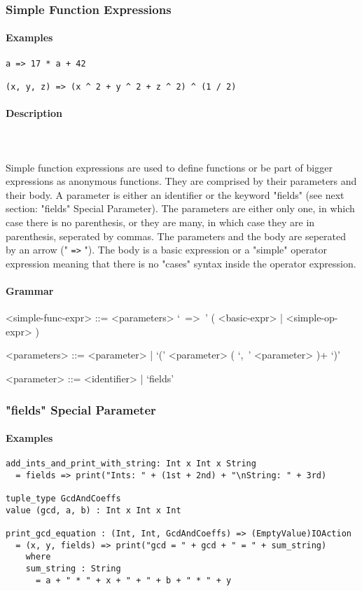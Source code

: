 \documentclass{article}
\def\pend{\mbox{} \\\\}
\begin{document}
\subsubsection{Simple Function Expressions}

\paragraph{Examples}

\begin{verbatim}
a => 17 * a + 42

(x, y, z) => (x ^ 2 + y ^ 2 + z ^ 2) ^ (1 / 2)
\end{verbatim}

\paragraph{Description}\pend
Simple function expressions are used to define functions or be part of bigger
expressions as anonymous functions. They are comprised by their parameters and
their body. A parameter is either an identifier or the keyword "fields" (see
next section: "fields" Special Parameter). The parameters are either only one,
in which case there is no parenthesis, or they are many, in which case they are
in parenthesis, seperated by commas. The parameters and the body are seperated
by an arrow (" \texttt{=>} "). The body is a basic expression or a "simple"
operator expression meaning that there is no "cases" syntax inside the operator
expression.

\paragraph{Grammar}
\begin{grammar}
<simple-func-expr> ::=
<parameters> `\ =>\ ' ( <basic-expr> | <simple-op-expr> )

<parameters> ::= <parameter> | `(' <parameter> ( `,\ ' <parameter> )+ `)'

<parameter> ::= <identifier> | `fields'\\ \end{grammar}

\subsubsection{"fields" Special Parameter}

\paragraph{Examples}
\begin{verbatim}
add_ints_and_print_with_string: Int x Int x String
  = fields => print("Ints: " + (1st + 2nd) + "\nString: " + 3rd)

tuple_type GcdAndCoeffs
value (gcd, a, b) : Int x Int x Int

print_gcd_equation : (Int, Int, GcdAndCoeffs) => (EmptyValue)IOAction
  = (x, y, fields) => print("gcd = " + gcd + " = " + sum_string)
    where
    sum_string : String
      = a + " * " + x + " + " + b + " * " + y
\end{verbatim}
\end{document}
